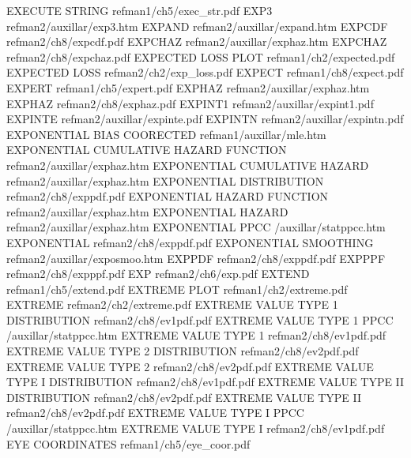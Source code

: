 EXECUTE STRING                          refman1/ch5/exec_str.pdf
EXP3                                    refman2/auxillar/exp3.htm
EXPAND                                  refman2/auxillar/expand.htm
EXPCDF                                  refman2/ch8/expcdf.pdf
EXPCHAZ                                 refman2/auxillar/exphaz.htm
EXPCHAZ                                 refman2/ch8/expchaz.pdf
EXPECTED LOSS PLOT                      refman1/ch2/expected.pdf
EXPECTED LOSS                           refman2/ch2/exp_loss.pdf
EXPECT                                  refman1/ch8/expect.pdf
EXPERT                                  refman1/ch5/expert.pdf
EXPHAZ                                  refman2/auxillar/exphaz.htm
EXPHAZ                                  refman2/ch8/exphaz.pdf
EXPINT1                                 refman2/auxillar/expint1.pdf
EXPINTE                                 refman2/auxillar/expinte.pdf
EXPINTN                                 refman2/auxillar/expintn.pdf
EXPONENTIAL BIAS COORECTED              refman1/auxillar/mle.htm
EXPONENTIAL CUMULATIVE HAZARD FUNCTION  refman2/auxillar/exphaz.htm
EXPONENTIAL CUMULATIVE HAZARD           refman2/auxillar/exphaz.htm
EXPONENTIAL DISTRIBUTION                refman2/ch8/exppdf.pdf
EXPONENTIAL HAZARD FUNCTION             refman2/auxillar/exphaz.htm
EXPONENTIAL HAZARD                      refman2/auxillar/exphaz.htm
EXPONENTIAL PPCC                        /auxillar/statppcc.htm
EXPONENTIAL                             refman2/ch8/exppdf.pdf
EXPONENTIAL SMOOTHING                   refman2/auxillar/exposmoo.htm
EXPPDF                                  refman2/ch8/exppdf.pdf
EXPPPF                                  refman2/ch8/expppf.pdf
EXP                                     refman2/ch6/exp.pdf
EXTEND                                  refman1/ch5/extend.pdf
EXTREME PLOT                            refman1/ch2/extreme.pdf
EXTREME                                 refman2/ch2/extreme.pdf
EXTREME VALUE TYPE 1 DISTRIBUTION       refman2/ch8/ev1pdf.pdf
EXTREME VALUE TYPE 1 PPCC               /auxillar/statppcc.htm
EXTREME VALUE TYPE 1                    refman2/ch8/ev1pdf.pdf
EXTREME VALUE TYPE 2 DISTRIBUTION       refman2/ch8/ev2pdf.pdf
EXTREME VALUE TYPE 2                    refman2/ch8/ev2pdf.pdf
EXTREME VALUE TYPE I DISTRIBUTION       refman2/ch8/ev1pdf.pdf
EXTREME VALUE TYPE II DISTRIBUTION      refman2/ch8/ev2pdf.pdf
EXTREME VALUE TYPE II                   refman2/ch8/ev2pdf.pdf
EXTREME VALUE TYPE I PPCC               /auxillar/statppcc.htm
EXTREME VALUE TYPE I                    refman2/ch8/ev1pdf.pdf
EYE COORDINATES                         refman1/ch5/eye_coor.pdf

